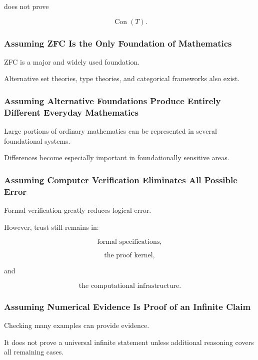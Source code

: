 does not prove

\[
\operatorname{Con}(T).
\]

\subsubsection{Assuming ZFC Is the Only Foundation of Mathematics}

ZFC is a major and widely used foundation.

Alternative set theories, type theories, and categorical frameworks also
exist.

\subsubsection{Assuming Alternative Foundations Produce Entirely Different Everyday Mathematics}

Large portions of ordinary mathematics can be represented in several
foundational systems.

Differences become especially important in foundationally sensitive areas.

\subsubsection{Assuming Computer Verification Eliminates All Possible Error}

Formal verification greatly reduces logical error.

However, trust still remains in:

\[
\boxed{
\text{formal specifications},
}
\]

\[
\boxed{
\text{the proof kernel},
}
\]

and

\[
\boxed{
\text{the computational infrastructure}.
}
\]

\subsubsection{Assuming Numerical Evidence Is Proof of an Infinite Claim}

Checking many examples can provide evidence.

It does not prove a universal infinite statement unless additional reasoning
covers all remaining cases.

